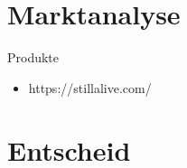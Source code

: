 
\section{Marktanalyse}
\label{sec:marktanalyse}

Produkte
\begin{itemize}
  \item https://stillalive.com/
\end{itemize}

\section{Entscheid}
\label{sec:entscheid}

